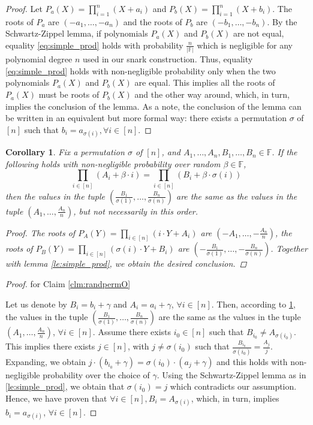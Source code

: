 \documentclass[11pt]{article} %
\newcommand{\F}{\ensuremath{\mathbb F}\xspace}
\newtheorem{corollary}[lemma]{Corollary}
\begin{document}
\begin{proof}
Let $P_a(X) =  \prod_{i=1}^{n}(X+ a_i)$ and $P_b(X) = \prod_{i=1}^{n}(X+b_i)$. The roots of $P_a$ are $(-a_1, \ldots, -a_n)$ and the roots of $P_b$ are $(-b_1, \ldots, -b_n)$.  
By the Schwartz-Zippel lemma, if polynomials $P_a(X)$ and $P_b(X)$ are not equal, equality \ref{eq:simple_prod} holds with probability $\frac{n}{|\mathbb{F}|}$ which is negligible for any polynomial degree $n$ used in our snark construction. 
Thus, equality \ref{eq:simple_prod} holds with non-negligible probability only when the two polynomials $P_a(X)$ and $P_b(X)$ are equal. This implies all the roots of $P_a(X)$ must be roots of $P_b(X)$ and the other way around, which, in turn, 
implies the conclusion of the lemma. As a note, the conclusion of the lemma can be written in an equivalent but more formal way: there exists a permutation $\sigma$ of $[n]$ such that $b_i = a_{\sigma(i)}, \forall i \in [n]$.
\end{proof}

\begin{corollary} \label{co:simple_prod}
Fix a permutation $\sigma$ of $[n]$, and $A_1,\ldots,A_n,B_1,\ldots,B_n \in \F$. If the following holds with non-negligible probability over random $\beta \in \F$, 
 \[\prod_{i\in [n]} (A_i + \beta \cdot i) = \prod_{i\in [n]} (B_i+ \beta \cdot \sigma(i))\] 
 then the values in the tuple $(\frac{B_1}{\sigma(1)}, \ldots, \frac{B_n}{\sigma(n)})$ are the same as the values in the tuple $(A_1, \ldots, \frac{A_n}{n})$, but not necessarily in this order. 
  
\begin{proof} The roots of $P_A(Y) = \prod_{i\in [n]} (i \cdot Y + A_i )$ are $(-A_1, \ldots, -\frac{A_n}{n})$, the roots of $P_B(Y) =  \prod_{i\in [n]} (\sigma (i) \cdot Y + B_i)$ are  $(-\frac{B_1}{\sigma(1)}, \ldots, -\frac{B_n}{\sigma(n)})$. Together with 
lemma \ref{le:simple_prod}, we obtain the desired conclusion.
\end{proof}

\end{corollary}

\begin{proof} for Claim \ref{clm:randpermO}

Let us denote by $B_i = b_i + \gamma$ and $A_i = a_i + \gamma$, $\forall i \in [n]$. Then, according to \ref{co:simple_prod}, the values in the tuple $(\frac{B_1}{\sigma(1)}, \ldots, \frac{B_n}{\sigma(n)})$ are the same as the values in 
the tuple $(A_1, \ldots, \frac{A_n}{n})$, $\forall i \in [n]$. Assume there exists $i_0 \in [n]$ such that $B_{i_0} \neq A_{\sigma(i_0)}$. This implies there exists $j \in [n]$, with $j \neq \sigma(i_0) $ such that $\frac{B_{i_0}}{\sigma(i_0)} = \frac{A_j}{j}$. 
Expanding, we obtain $j \cdot (b_{i_0}+ \gamma) = \sigma(i_0) \cdot (a_j + \gamma)$ and this holds with non-negligible probability over the choice of $\gamma$. Using the Schwartz-Zippel lemma as in \ref{le:simple_prod}, 
we obtain that $\sigma(i_0) = j$ which contradicts our assumption. Hence, we have proven that $\forall  i \in [n], B_i = A_{\sigma(i)}$, which, in turn, implies $b_i = a_{\sigma(i)}$, $\forall  i \in [n]$. 
\end{proof}
\end{document}

